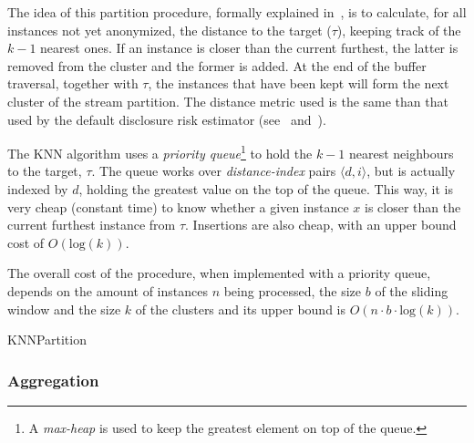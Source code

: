 The idea of this partition procedure, formally explained in~, is to calculate, for all instances not yet anonymized, the distance to the target ($\tau$), keeping track of the $k-1$ nearest ones. If an instance is closer than the current furthest, the latter is removed from the cluster and the former is added. At the end of the buffer traversal, together with $\tau$, the instances that have been kept will form the next cluster of the stream partition. The distance metric used is the same than that used by the default disclosure risk estimator (see~ and~).

The KNN algorithm uses a \textit{priority queue}\footnote{A \textit{max-heap} is used to keep the greatest element on top of the queue.} to hold the $k-1$ nearest neighbours to the target, $\tau$. The queue works over \textit{distance-index} pairs $\langle d, i\rangle$, but is actually indexed by $d$, holding the greatest value on the top of the queue. This way, it is very cheap (constant time) to know whether a given instance $x$ is closer than the current furthest instance from $\tau$. Insertions are also cheap, with an upper bound cost of $O(\mathrm{log}(k))$.

The overall cost of the procedure, when implemented with a priority queue, depends on the amount of instances $n$ being processed, the size $b$ of the sliding window and the size $k$ of the clusters and its upper bound is $O(n \cdot b \cdot \mathrm{log}(k))$.

\begin{algorithm}
\caption{KNNPartition\label{al:KNN-partition}}
\end{algorithm}

\subsubsection{Aggregation}

